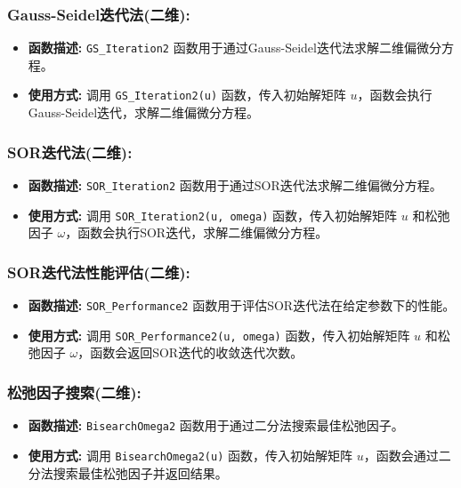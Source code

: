 \documentclass{article}
\begin{document}
\subsubsection*{Gauss-Seidel迭代法(二维):}
\begin{itemize}
	\item \textbf{函数描述:} \texttt{GS\_Iteration2} 函数用于通过Gauss-Seidel迭代法求解二维偏微分方程。
	\item \textbf{使用方式:} 调用 \texttt{GS\_Iteration2(u)} 函数，传入初始解矩阵 $u$，函数会执行Gauss-Seidel迭代，求解二维偏微分方程。
\end{itemize}

\subsubsection*{SOR迭代法(二维):}
\begin{itemize}
	\item \textbf{函数描述:} \texttt{SOR\_Iteration2} 函数用于通过SOR迭代法求解二维偏微分方程。
	\item \textbf{使用方式:} 调用 \texttt{SOR\_Iteration2(u, omega)} 函数，传入初始解矩阵 $u$ 和松弛因子 $\omega$，函数会执行SOR迭代，求解二维偏微分方程。
\end{itemize}

\subsubsection*{SOR迭代法性能评估(二维):}
\begin{itemize}
	\item \textbf{函数描述:} \texttt{SOR\_Performance2} 函数用于评估SOR迭代法在给定参数下的性能。
	\item \textbf{使用方式:} 调用 \texttt{SOR\_Performance2(u, omega)} 函数，传入初始解矩阵 $u$ 和松弛因子 $\omega$，函数会返回SOR迭代的收敛迭代次数。
\end{itemize}

\subsubsection*{松弛因子搜索(二维):}
\begin{itemize}
	\item \textbf{函数描述:} \texttt{BisearchOmega2} 函数用于通过二分法搜索最佳松弛因子。
	\item \textbf{使用方式:} 调用 \texttt{BisearchOmega2(u)} 函数，传入初始解矩阵 $u$，函数会通过二分法搜索最佳松弛因子并返回结果。
\end{itemize}
\end{document}
